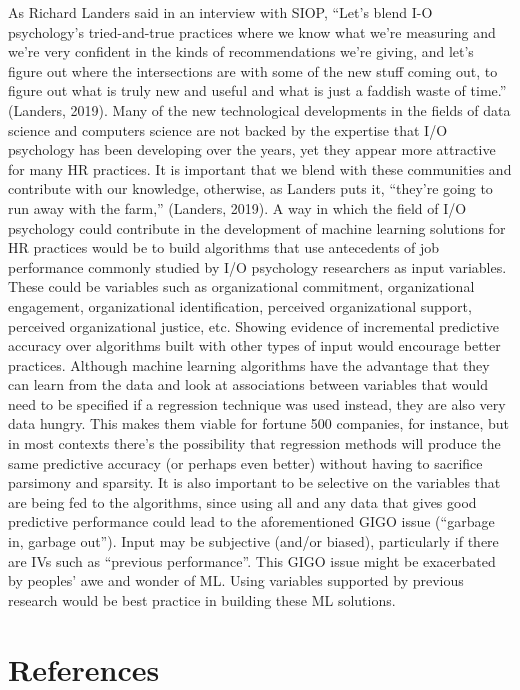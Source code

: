 \documentclass[
  man]{apa7}
\begin{document}
As Richard Landers said in an interview with SIOP, ``Let's blend I-O psychology's tried-and-true practices where we know what we're measuring and we're very confident in the kinds of recommendations we're giving, and let's figure out where the intersections are with some of the new stuff coming out, to figure out what is truly new and useful and what is just a faddish waste of time.'' (Landers, 2019).
Many of the new technological developments in the fields of data science and computers science are not backed by the expertise that I/O psychology has been developing over the years, yet they appear more attractive for many HR practices.
It is important that we blend with these communities and contribute with our knowledge, otherwise, as Landers puts it, ``they're going to run away with the farm,'' (Landers, 2019).
A way in which the field of I/O psychology could contribute in the development of machine learning solutions for HR practices would be to build algorithms that use antecedents of job performance commonly studied by I/O psychology researchers as input variables.
These could be variables such as organizational commitment, organizational engagement, organizational identification, perceived organizational support, perceived organizational justice, etc.
Showing evidence of incremental predictive accuracy over algorithms built with other types of input would encourage better practices.
Although machine learning algorithms have the advantage that they can learn from the data and look at associations between variables that would need to be specified if a regression technique was used instead, they are also very data hungry.
This makes them viable for fortune 500 companies, for instance, but in most contexts there's the possibility that regression methods will produce the same predictive accuracy (or perhaps even better) without having to sacrifice parsimony and sparsity.
It is also important to be selective on the variables that are being fed to the algorithms, since using all and any data that gives good predictive performance could lead to the aforementioned GIGO issue (``garbage in, garbage out'').
Input may be subjective (and/or biased), particularly if there are IVs such as ``previous performance''.
This GIGO issue might be exacerbated by peoples' awe and wonder of ML.
Using variables supported by previous research would be best practice in building these ML solutions.

\newpage

\section{References}\label{references}
\end{document}
